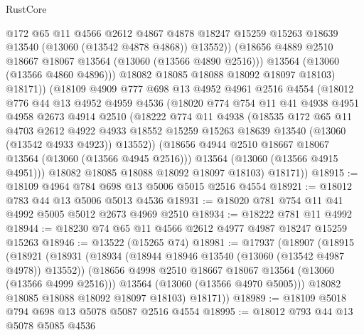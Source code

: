 \begin{lexlean}{RustCore}
\begin{coremodule}
                  @172
                  @65
                  @11
                  @4566
                  @2612
                  @4867
                  @4878
                  @18247
                  @15259
                  @15263
                  @18639
                  @13540
                  (@13060 (@13542 @4878 @4868))
                  @13552))
              (@18656 @4889 @2510 @18667 @18067 @13564 (@13060 (@13566 @4890 @2516)))
              @13564
              (@13060 (@13566 @4860 @4896)))
            @18082
            @18085
            @18088
            @18092
            @18097
            @18103)
          @18171))
      (@18109
        @4909
        @777
        @698
        @13
        @4952
        @4961
        @2516
        @4554
        (@18012
          @776
          @44
          @13
          @4952
          @4959
          @4536
          (@18020
            @774
            @754
            @11
            @41
            @4938
            @4951
            @4958
            @2673
            @4914
            @2510
            (@18222
              @774
              @11
              @4938
              (@18535
                @172
                @65
                @11
                @4703
                @2612
                @4922
                @4933
                @18552
                @15259
                @15263
                @18639
                @13540
                (@13060 (@13542 @4933 @4923))
                @13552))
            (@18656 @4944 @2510 @18667 @18067 @13564 (@13060 (@13566 @4945 @2516)))
            @13564
            (@13060 (@13566 @4915 @4951)))
          @18082
          @18085
          @18088
          @18092
          @18097
          @18103)
        @18171))
@18915 := @18109 @4964 @784 @698 @13 @5006 @5015 @2516 @4554
@18921 := @18012 @783 @44 @13 @5006 @5013 @4536
@18931 := @18020 @781 @754 @11 @41 @4992 @5005 @5012 @2673 @4969 @2510
@18934 := @18222 @781 @11 @4992
@18944 := @18230 @74 @65 @11 @4566 @2612 @4977 @4987 @18247 @15259 @15263
@18946 := @13522 (@15265 @74)
@18981 := @17937
    (@18907
      (@18915
        (@18921
          (@18931
            (@18934 (@18944 @18946 @13540 (@13060 (@13542 @4987 @4978)) @13552))
            (@18656 @4998 @2510 @18667 @18067 @13564 (@13060 (@13566 @4999 @2516)))
            @13564
            (@13060 (@13566 @4970 @5005)))
          @18082
          @18085
          @18088
          @18092
          @18097
          @18103)
        @18171))
@18989 := @18109 @5018 @794 @698 @13 @5078 @5087 @2516 @4554
@18995 := @18012 @793 @44 @13 @5078 @5085 @4536

\end{coremodule}
\end{lexlean}
